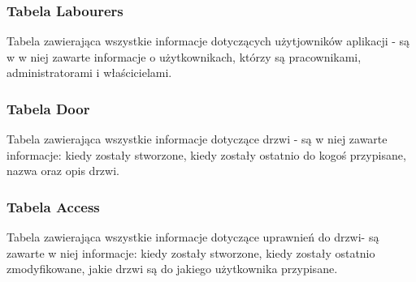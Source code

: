 \subsubsection{Tabela Labourers}
\noindent Tabela zawierająca wszystkie informacje dotyczących użytjowników aplikacji - są w 
w niej zawarte informacje o użytkownikach, którzy są pracownikami, 
administratorami i właścicielami.
\begin{table}[h]
    \centering
    \caption{Tabela Labourers}
    \end{table}


\subsubsection{Tabela Door}
\noindent Tabela zawierająca wszystkie informacje dotyczące drzwi -
 są w niej zawarte informacje: kiedy zostały stworzone, kiedy zostały ostatnio do kogoś przypisane, 
 nazwa oraz opis drzwi.
 \begin{table}[h]
    \centering
    \caption{Tabela Door}
\end{table}

\subsubsection{Tabela Access}
\noindent Tabela zawierająca wszystkie informacje dotyczące uprawnień do drzwi-
są zawarte w niej informacje: kiedy zostały stworzone, kiedy zostały ostatnio zmodyfikowane,
jakie drzwi są do jakiego użytkownika przypisane.
\begin{table}[h]
    \centering
    \caption{Tabela Access}
\end{table}

